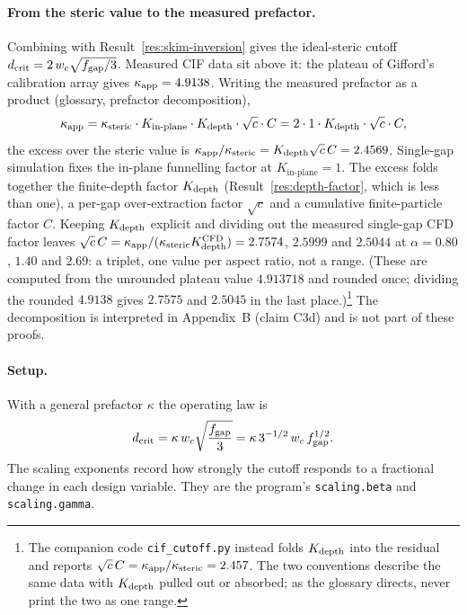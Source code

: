 \paragraph{From the steric value to the measured prefactor.} Combining with
Result~\ref{res:skim-inversion} gives the ideal-steric cutoff
$d_{\mathrm{crit}} = 2\,w_c\sqrt{f_{\mathrm{gap}}/3}$. Measured CIF data sit above it: the plateau of Gifford's
calibration array gives $\kappa_{\mathrm{app}}=4.9138$. Writing the measured prefactor as a product
(glossary, prefactor decomposition),
\begin{equation}
\kappa_{\mathrm{app}} = \kappa_{\mathrm{steric}}\cdot K_{\text{in-plane}}\cdot K_{\mathrm{depth}}\cdot \sqrt{c}\cdot C
= 2\cdot 1\cdot K_{\mathrm{depth}}\cdot \sqrt{c}\cdot C,
\end{equation}
the excess over the steric value is $\kappa_{\mathrm{app}}/\kappa_{\mathrm{steric}} = K_{\mathrm{depth}}\sqrt{c}\,C = 2.4569$.
Single-gap simulation fixes the in-plane funnelling factor at $K_{\text{in-plane}}=1$. The
excess folds together the finite-depth factor $K_{\mathrm{depth}}$ (Result~\ref{res:depth-factor}, which
is less than one), a per-gap over-extraction factor $\sqrt{c}$ and a cumulative finite-particle
factor $C$. Keeping $K_{\mathrm{depth}}$ explicit and dividing out the measured single-gap CFD factor
leaves $\sqrt{c}\,C = \kappa_{\mathrm{app}}/(\kappa_{\mathrm{steric}}K_{\mathrm{depth}}^{\mathrm{CFD}}) = 2.7574$, $2.5999$ and $2.5044$ at
$\alpha = 0.80$, $1.40$ and $2.69$: a triplet, one value per aspect ratio, not a
range. (These are computed from the unrounded plateau value $4.913718$ and rounded once; dividing
the rounded $4.9138$ gives $2.7575$ and $2.5045$ in the last place.)\footnote{The companion code \texttt{cif\_cutoff.py} instead folds $K_{\mathrm{depth}}$ into the
residual and reports $\sqrt{c}\,C=\kappa_{\mathrm{app}}/\kappa_{\mathrm{steric}}=2.457$. The two conventions describe the same
data with $K_{\mathrm{depth}}$ pulled out or absorbed; as the glossary directs, never print the two as one
range.} The decomposition is interpreted in Appendix~B (claim C3d) and is not part of these
proofs.

\label{res:exponents}

\paragraph{Setup.} With a general prefactor $\kappa$ the operating law is
\begin{equation}
d_{\mathrm{crit}} = \kappa\, w_c \sqrt{\frac{f_{\mathrm{gap}}}{3}} = \kappa\,3^{-1/2}\, w_c\, f_{\mathrm{gap}}^{1/2}.
\label{eq:law}
\end{equation}
The scaling exponents record how strongly the cutoff responds to a fractional change in each
design variable. They are the program's \texttt{scaling.beta} and \texttt{scaling.gamma}.

